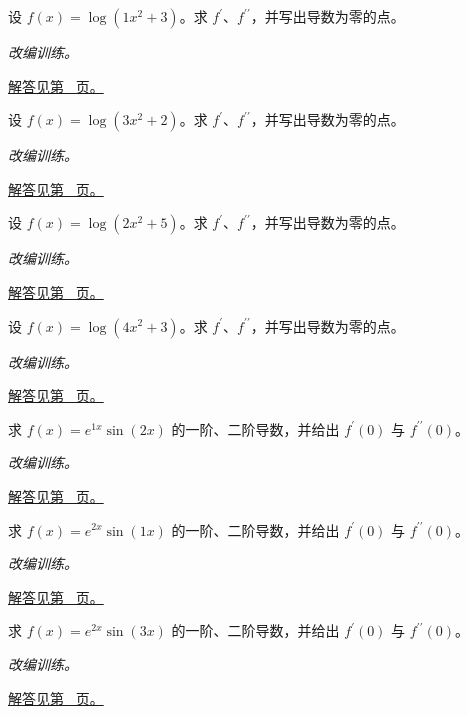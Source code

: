 \documentclass[UTF8,12pt,a4paper,fontset=fandol]{ctexart}
\begin{document}
\begin{example}[对数复合与二阶导数]\label{ex:c8q15}
设 $f(x)=\log(1x^2+3)$。求 $f^{\prime}$、$f^{\prime\prime}$，并写出导数为零的点。
\par\textit{改编训练。}\par\hyperref[ans:c8q15]{解答见第~\pageref{ans:c8q15} 页。}
\end{example}
\begin{example}[对数复合与二阶导数]\label{ex:c8q16}
设 $f(x)=\log(3x^2+2)$。求 $f^{\prime}$、$f^{\prime\prime}$，并写出导数为零的点。
\par\textit{改编训练。}\par\hyperref[ans:c8q16]{解答见第~\pageref{ans:c8q16} 页。}
\end{example}
\begin{example}[对数复合与二阶导数]\label{ex:c8q17}
设 $f(x)=\log(2x^2+5)$。求 $f^{\prime}$、$f^{\prime\prime}$，并写出导数为零的点。
\par\textit{改编训练。}\par\hyperref[ans:c8q17]{解答见第~\pageref{ans:c8q17} 页。}
\end{example}
\begin{example}[对数复合与二阶导数]\label{ex:c8q18}
设 $f(x)=\log(4x^2+3)$。求 $f^{\prime}$、$f^{\prime\prime}$，并写出导数为零的点。
\par\textit{改编训练。}\par\hyperref[ans:c8q18]{解答见第~\pageref{ans:c8q18} 页。}
\end{example}
\begin{example}[指数与三角函数的复合求导]\label{ex:c8q19}
求 $f(x)=e^{1x}\sin(2x)$ 的一阶、二阶导数，并给出 $f^{\prime}(0)$ 与 $f^{\prime\prime}(0)$。
\par\textit{改编训练。}\par\hyperref[ans:c8q19]{解答见第~\pageref{ans:c8q19} 页。}
\end{example}
\begin{example}[指数与三角函数的复合求导]\label{ex:c8q20}
求 $f(x)=e^{2x}\sin(1x)$ 的一阶、二阶导数，并给出 $f^{\prime}(0)$ 与 $f^{\prime\prime}(0)$。
\par\textit{改编训练。}\par\hyperref[ans:c8q20]{解答见第~\pageref{ans:c8q20} 页。}
\end{example}
\begin{example}[指数与三角函数的复合求导]\label{ex:c8q21}
求 $f(x)=e^{2x}\sin(3x)$ 的一阶、二阶导数，并给出 $f^{\prime}(0)$ 与 $f^{\prime\prime}(0)$。
\par\textit{改编训练。}\par\hyperref[ans:c8q21]{解答见第~\pageref{ans:c8q21} 页。}
\end{example}
\end{document}
